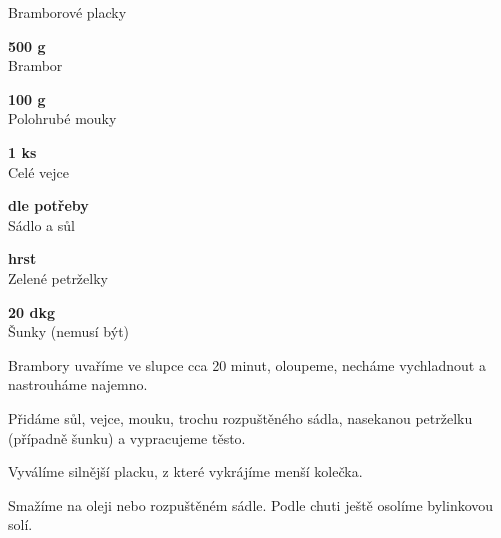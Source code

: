 \documentclass[11pt,a4paper]{article}
\begin{document}
\begin{recipe}[DarkKhaki]{Bramborové placky}
    \begin{ingredients}
        \item \parbox[t]{\linewidth}{\raggedright \weight \textbf{500 g}\\ Brambor}
        \item \parbox[t]{\linewidth}{\raggedright \weight \textbf{100 g}\\ Polohrubé mouky}
        \item \parbox[t]{\linewidth}{\raggedright \piece \textbf{1 ks}\\ Celé vejce}
        \item \parbox[t]{\linewidth}{\raggedright \indefinite \textbf{dle potřeby}\\ Sádlo a sůl}
        \item \parbox[t]{\linewidth}{\raggedright \indefinite \textbf{hrst}\\ Zelené petrželky}
        \item \parbox[t]{\linewidth}{\raggedright \weight \textbf{20 dkg}\\ Šunky (nemusí být)}
    \end{ingredients}
    \begin{steps}
        \item Brambory uvaříme ve slupce cca 20 minut, oloupeme, necháme vychladnout a nastrouháme najemno.
        \item Přidáme sůl, vejce, mouku, trochu rozpuštěného sádla, nasekanou petrželku (případně šunku) a vypracujeme těsto.
        \item Vyválíme silnější placku, z které vykrájíme menší kolečka.
        \item Smažíme na oleji nebo rozpuštěném sádle. Podle chuti ještě osolíme bylinkovou solí.
    \end{steps}
\end{recipe}

\end{document}
